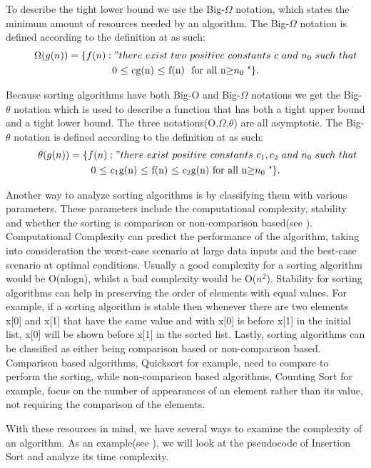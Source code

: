 \documentclass{article}
\numberwithin{figure}{section}
\begin{document}
To describe the tight lower bound we use the Big-$\Omega$ notation, which states the minimum amount of resources needed by an algorithm. The Big-$\Omega$ notation is defined according to the definition at \cite{Thomas} as such:
\begin{align*}
\Omega(g(n))=\{f(n):"there\ exist\ two\ positive\ constants\ c\ and\ n_0\ such\ that \endline 
\centerline{0 $\leq$ cg(n) $\leq$ f(n) \ for\ all\ n$\geq$$n_0$ "\}.} 
\end {align*}

Because sorting algorithms have both Big-O and Big-$\Omega$ notations we get the Big-$\theta$ notation which is used to describe a function that has both a tight upper bound and a tight lower bound. The three notations(O,$\Omega$,$\theta$) are all asymptotic. The Big-$\theta$ notation is defined according to the definition at \cite{Thomas} as such:
\begin{align*}
\theta(g(n))=\{f(n):"there\ exist\ positive\ constants\ c_1, c_2\ and\ n_0\ such\ that\endline
\centerline{0 $\leq$ $c_1$g(n) $\leq$ f(n) $\leq$ $c_2$g(n)\ for\ all\ n$\geq$$n_0$ "\}.}
\end {align*}

Another way to analyze sorting algorithms is by classifying them with various parameters. These parameters include the computational complexity, stability and whether the sorting is comparison or non-comparison based(see \cite{Thomas}\cite{Kurt}\cite{Adam}). Computational Complexity can predict the performance of the algorithm, taking into consideration the worst-case scenario at large data inputs and the best-case scenario at optimal conditions. Usually a good complexity for a sorting algorithm would be O(nlogn), whilst a bad complexity would be O($n^2$). Stability for sorting algorithms can help in preserving the order of elements with equal values. For example, if a sorting algorithm is stable then whenever there are two elements x[0] and x[1] that have the same value and with x[0] is before x[1] in the initial list, x[0] will be shown before x[1] in the sorted list. Lastly, sorting algorithms can be classified as either being comparison based or non-comparison based. Comparison based algorithms, Quicksort for example, need to compare to perform the sorting, while non-comparison based algorithms, Counting Sort for example, focus on the number of appearances of an element rather than its value, not requiring the comparison of the elements.

With these resources in mind, we have several ways to examine the complexity of an algorithm. As an example(see \cite{Thomas}\cite{Kurt}\cite{Gabi}), we will look at the pseudocode of Insertion Sort and analyze its time complexity.
\end{document}
